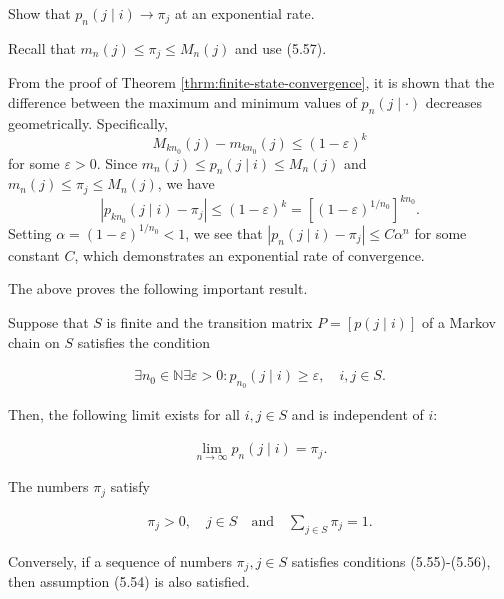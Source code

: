 \begin{Exercise}
\label{exr:exponential-convergence}
Show that $p_n(j \mid i) \to \pi_j$ at an exponential rate.

\begin{hint}
Recall that $m_n(j) \leq \pi_j \leq M_n(j)$ and use (5.57).
\end{hint}
\end{Exercise}

\begin{Solution}
From the proof of Theorem \ref{thrm:finite-state-convergence}, it is shown that the difference between the maximum and minimum values of $p_n(j \mid \cdot)$ decreases geometrically. Specifically,
\[
M_{k n_0}(j) - m_{k n_0}(j) \leq (1-\varepsilon)^k
\]
for some $\varepsilon > 0$. Since $m_n(j) \leq p_n(j \mid i) \leq M_n(j)$ and $m_n(j) \leq \pi_j \leq M_n(j)$, we have
\[
|p_{k n_0}(j \mid i) - \pi_j| \leq (1-\varepsilon)^k = [(1-\varepsilon)^{1/n_0}]^{k n_0}.
\]
Setting $\alpha = (1-\varepsilon)^{1/n_0} < 1$, we see that $|p_n(j \mid i) - \pi_j| \leq C \alpha^n$ for some constant $C$, which demonstrates an exponential rate of convergence.
\end{Solution}

The above proves the following important result.

\begin{Theorem}
\label{thrm:finite-state-convergence}
Suppose that $S$ is finite and the transition matrix $P = [p(j \mid i)]$ of a Markov chain on $S$ satisfies the condition

\begin{align}
\exists n_0 \in \mathbb{N} \exists \varepsilon > 0: p_{n_0}(j \mid i) \geq \varepsilon, \quad i, j \in S. \tag{5.54}
\end{align}

Then, the following limit exists for all $i, j \in S$ and is independent of $i$:

\begin{align}
\lim_{n \to \infty} p_n(j \mid i) = \pi_j. \tag{5.55}
\end{align}

The numbers $\pi_j$ satisfy

\begin{align}
\pi_j > 0, \quad j \in S \quad \text{and} \quad \sum_{j \in S} \pi_j = 1. \tag{5.56}
\end{align}

Conversely, if a sequence of numbers $\pi_j, j \in S$ satisfies conditions (5.55)-(5.56), then assumption (5.54) is also satisfied.
\end{Theorem}

